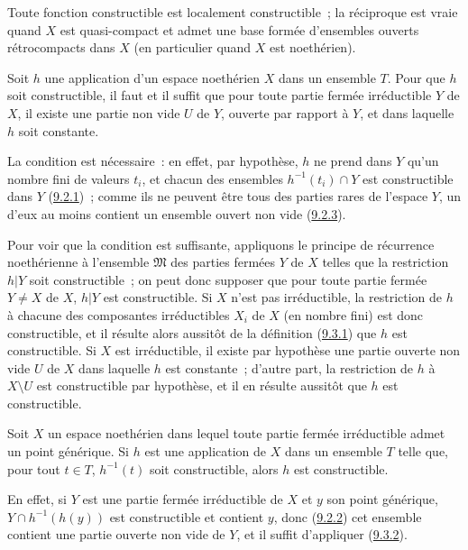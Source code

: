Toute fonction constructible est localement constructible~; la réciproque
est vraie quand $X$ est quasi-compact et admet une base formée d'ensembles
ouverts rétrocompacts dans $X$ (en particulier quand $X$ est noethérien).

\begin{proposition}[9.3.2]
\label{0.9.3.2-fr}
Soit $h$ une application d'un espace noethérien $X$ dans un ensemble $T$.
Pour que $h$ soit constructible, il faut et il suffit que pour toute partie
fermée irréductible $Y$ de $X$, il existe une partie non vide $U$ de $Y$,
ouverte par rapport à $Y$, et dans laquelle $h$ soit constante.
\end{proposition}

La condition est nécessaire~: en effet, par hypothèse, $h$ ne prend dans $Y$
qu'un nombre fini de valeurs $t_i$, et chacun des ensembles
$h^{-1}(t_i)\cap Y$ est constructible dans $Y$
(\hyperref[0.9.2.1-fr]{9.2.1})~; comme ils ne peuvent être tous des parties
rares de l'espace $Y$, un d'eux au moins contient un ensemble ouvert non vide
(\hyperref[0.9.2.3-fr]{9.2.3}).

Pour voir que la condition est suffisante, appliquons le principe de
récurrence noethérienne à l'ensemble $\mathfrak{M}$ des parties fermées $Y$
de $X$ telles que la restriction $h|Y$ soit constructible~; on peut donc
supposer que pour toute partie fermée $Y\ne X$ de $X$, $h|Y$ est
constructible. Si $X$ n'est pas irréductible, la restriction de $h$ à
chacune des composantes irréductibles $X_i$ de $X$ (en nombre fini) est donc
constructible, et il résulte alors aussitôt de la définition
(\hyperref[0.9.3.1-fr]{9.3.1}) que $h$ est constructible. Si $X$ est
irréductible, il existe par hypothèse une partie ouverte non vide $U$ de $X$
dans laquelle $h$ est constante~; d'autre part, la restriction de $h$ à
$X\setminus U$ est constructible par hypothèse, et il en résulte aussitôt
que $h$ est constructible.

\begin{corollary}[9.3.3]
\label{0.9.3.3-fr}
Soit $X$ un espace noethérien dans lequel toute partie fermée irréductible
admet un point générique. Si $h$ est une application de $X$ dans un ensemble
$T$ telle que, pour tout $t\in T$, $h^{-1}(t)$ soit constructible, alors $h$
est constructible.
\end{corollary}

En effet, si $Y$ est une partie fermée irréductible de $X$ et $y$ son point
générique, $Y\cap h^{-1}(h(y))$ est constructible et contient $y$, donc
(\hyperref[0.9.2.2-fr]{9.2.2}) cet ensemble contient une partie ouverte non
vide de $Y$, et il suffit d'appliquer (\hyperref[0.9.3.2-fr]{9.3.2}).

